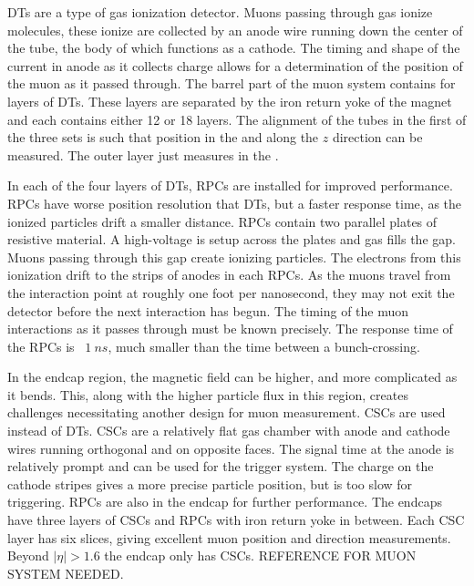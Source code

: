 DTs are a type of gas ionization detector.  Muons passing through gas ionize molecules, these ionize are collected by an anode wire running down the center of the tube, the body of which functions as a cathode.  The timing and shape of the current in anode as it collects charge allows for a determination of the position of the muon as it passed through.  The barrel part of the muon system contains for layers of DTs.  These layers are separated by the iron return yoke of the magnet and each contains either 12 or 18 layers.  The alignment of the tubes in the first of the three sets is such that position in the \rphiplane and along the \ensuremath{z} direction can be measured.  The outer layer just measures in the \rphiplane.

In each of the four layers of DTs, RPCs are installed for improved performance.  RPCs have worse position resolution that DTs, but a faster response time, as the ionized particles drift a smaller distance.  RPCs contain two parallel plates of resistive material.  A high-voltage is setup across the plates and gas fills the gap.  Muons passing through this gap create ionizing particles.  The electrons from this ionization drift to the strips of anodes in each RPCs.  As the muons travel from the interaction point at roughly one foot per nanosecond, they may not exit the detector before the next interaction has begun.  The timing of the muon interactions as it passes through must be known precisely.  The response time of the RPCs is ~\ensuremath{\SI{1}{ns}}, much smaller than the time between a bunch-crossing.

In the endcap region, the magnetic field can be higher, and more complicated as it bends.  This, along with the higher particle flux in this region, creates challenges necessitating another design for muon measurement.  CSCs are used instead of DTs.  CSCs are a relatively flat gas chamber with anode and cathode wires running orthogonal and on opposite faces.  The signal time at the anode is relatively prompt and can be used for the \CMS trigger system.  The charge on the cathode stripes gives a more precise particle position, but is too slow for triggering.  RPCs are also in the endcap for further performance.  The endcaps have three layers of CSCs and RPCs with iron return yoke in between.  Each CSC layer has six slices, giving excellent muon position and direction measurements.  Beyond \ensuremath{|\eta| \gt 1.6} the endcap only has CSCs. REFERENCE FOR MUON SYSTEM NEEDED.

